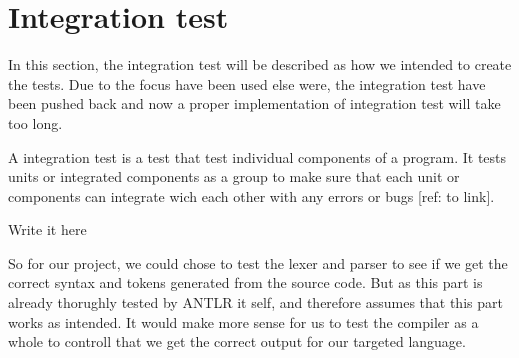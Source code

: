 \section{Integration test}\label{subsec:integrationtest}
In this section, the integration test will be described as how we intended to create the tests. Due to the focus have been used else were, the integration test have been pushed back and now a proper implementation of integration test will take too long.

A integration test is a test that test individual components of a program. It tests units or integrated components as a group to make sure that each unit or components can integrate wich each other with any errors or bugs [ref: to link].

Write it here

    
So for our project, we could chose to test the lexer and parser to see if we get the correct syntax and tokens generated from the source code. But as this part is already thorughly tested by ANTLR it self, and therefore assumes that this part works as intended. It would make more sense for us to test the compiler as a whole to controll that we get the correct output for our targeted language.


